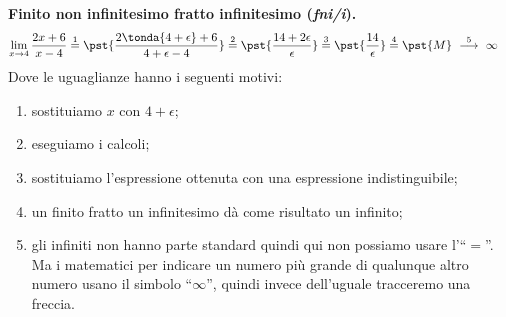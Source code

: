 \begin{esempio}
\textbf{Finito non infinitesimo fratto infinitesimo (\emph{fni/i}).}
\begin{align*}
\lim_{x \rightarrow 4} \frac{2x+6}{x-4} & \stackrel{1}{=} 
  \pst{\frac{2\tonda{4+\epsilon}+6}{4+\epsilon-4}} \stackrel{2}{=}  
  \pst{\frac{14 + 2 \epsilon}{\epsilon}} \stackrel{3}{=} 
  \pst{\frac{14}{\epsilon}} \stackrel{4}{=} 
  \pst{M} \stackrel{5}{~\longrightarrow~} \infty
\end{align*}
Dove le uguaglianze hanno i seguenti motivi:
\begin{enumerate} [nosep]
 \item sostituiamo \(x\) con \(4+\epsilon\);
 \item eseguiamo i calcoli;
 \item sostituiamo l'espressione ottenuta con una espressione 
   indistinguibile;
 \item un finito fratto un infinitesimo dà come risultato un infinito; 
 \item gli infiniti non hanno parte standard quindi qui non possiamo usare 
l'``\(=\)''. Ma i matematici per indicare un numero più grande di qualunque 
altro numero usano il simbolo ``\(\infty\)'', quindi invece dell'uguale 
tracceremo una freccia.
\end{enumerate}
\end{esempio}

